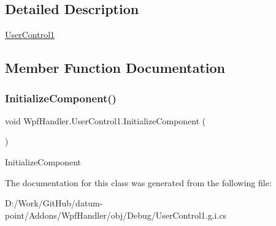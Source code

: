 \subsection{Detailed Description}
\mbox{\hyperlink{class_wpf_handler_1_1_user_control1}{User\+Control1}} 



\subsection{Member Function Documentation}
\mbox{\label{class_wpf_handler_1_1_user_control1_a4be9da09a92a3fd301a67bf224d2f3d5}} 
\subsubsection{\texorpdfstring{Initialize\+Component()}{InitializeComponent()}}
{\footnotesize\ttfamily void Wpf\+Handler.\+User\+Control1.\+Initialize\+Component (\begin{DoxyParamCaption}{ }\end{DoxyParamCaption})}



Initialize\+Component 



The documentation for this class was generated from the following file\+:\begin{DoxyCompactItemize}
\item 
D\+:/\+Work/\+Git\+Hub/datum-\/point/\+Addons/\+Wpf\+Handler/obj/\+Debug/User\+Control1.\+g.\+i.\+cs\end{DoxyCompactItemize}

